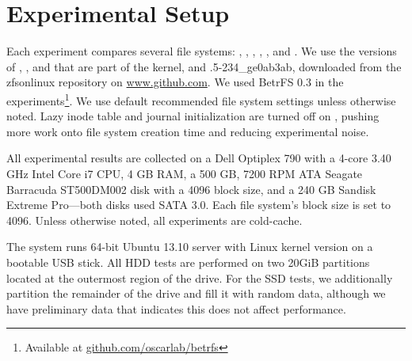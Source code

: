 \section{Experimental Setup}\label{sec:fsa-setup}

Each experiment compares several file systems: \betrfs, \btrfs, \ext, \ftwofs,
\xfs, and \zfs.  We use the versions of \xfs, \btrfs, \ext and \ftwofs that are
part of the \linuxver kernel, and .5-234\_ge0ab3ab, downloaded from the
zfsonlinux repository on \url{www.github.com}.  We used BetrFS 0.3 in the
experiments\footnote{Available at \url{github.com/oscarlab/betrfs}}.  We use
default recommended file system settings unless otherwise noted.  Lazy inode
table and journal initialization are turned off on \ext, pushing more work onto
file system creation time and reducing experimental noise. 

All experimental results are collected on a Dell Optiplex 790 with a 4-core
3.40 GHz Intel Core i7 CPU, 4 GB RAM, a 500 GB, 7200 RPM ATA Seagate Barracuda
ST500DM002 disk with a \SI{4096}{\byte} block size, and a 240 GB Sandisk
Extreme Pro---both disks used SATA 3.0.  Each file system's block size is set
to \SI{4096}{\byte}.  Unless otherwise noted, all experiments are cold-cache.

The system runs 64-bit Ubuntu 13.10 server with Linux kernel version
\linuxver{} on a bootable USB stick.  All HDD tests are performed on two 20GiB
partitions located at the outermost region of the drive.  For the SSD tests, we
additionally partition the remainder of the drive and fill it with random data,
although we have preliminary data that indicates this does not affect
performance.
